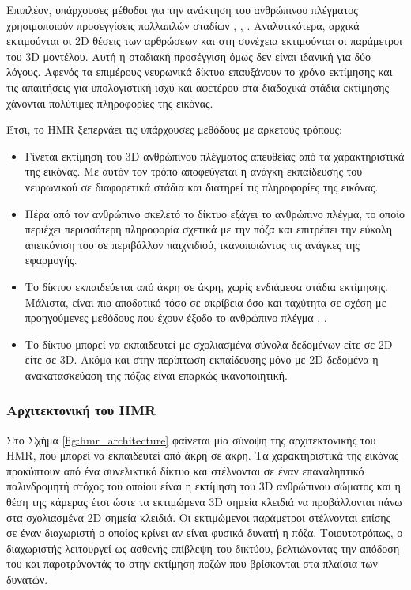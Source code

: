 Επιπλέον, υπάρχουσες μέθοδοι για την ανάκτηση του ανθρώπινου πλέγματος χρησιμοποιούν προσεγγίσεις πολλαπλών σταδίων \cite{keep_it_smpl_paper}, \cite{unite_the_people}, \cite{estimate_from_single_color_paper}. Αναλυτικότερα, αρχικά εκτιμούνται οι 2D θέσεις των αρθρώσεων και στη συνέχεια εκτιμούνται οι παράμετροι του 3D μοντέλου. Αυτή η σταδιακή προσέγγιση όμως δεν είναι ιδανική για δύο λόγους. Αφενός τα επιμέρους νευρωνικά δίκτυα επαυξάνουν το χρόνο εκτίμησης και τις απαιτήσεις για υπολογιστική ισχύ και αφετέρου στα διαδοχικά στάδια εκτίμησης χάνονται πολύτιμες πληροφορίες της εικόνας.

Έτσι, το HMR ξεπερνάει τις υπάρχουσες μεθόδους με αρκετούς τρόπους:

\begin{itemize}
	\item Γίνεται εκτίμηση του 3D ανθρώπινου πλέγματος απευθείας από τα χαρακτηριστικά της εικόνας. Με αυτόν τον τρόπο αποφεύγεται η ανάγκη εκπαίδευσης του νευρωνικού σε διαφορετικά στάδια και διατηρεί τις πληροφορίες της εικόνας.
	\item Πέρα από τον ανθρώπινο σκελετό το δίκτυο εξάγει το ανθρώπινο πλέγμα, το οποίο περιέχει περισσότερη πληροφορία σχετικά με την πόζα και επιτρέπει την εύκολη απεικόνιση του σε περιβάλλον παιχνιδιού, ικανοποιώντας τις ανάγκες της εφαρμογής.
	\item Το δίκτυο εκπαιδεύεται από άκρη σε άκρη, χωρίς ενδιάμεσα στάδια εκτίμησης. Μάλιστα, είναι πιο αποδοτικό τόσο σε ακρίβεια όσο και ταχύτητα σε σχέση με προηγούμενες μεθόδους που έχουν έξοδο το ανθρώπινο πλέγμα \cite{unite_the_people}, \cite{keep_it_smpl_paper}.
	\item Το δίκτυο μπορεί να εκπαιδευτεί με σχολιασμένα σύνολα δεδομένων είτε σε 2D είτε σε 3D. Ακόμα και στην περίπτωση εκπαίδευσης μόνο με 2D δεδομένα η ανακατασκεύαση της πόζας είναι επαρκώς ικανοποιητική.
\end{itemize}

\subsubsection{Αρχιτεκτονική του HMR}
Στο Σχήμα \ref{fig:hmr_architecture} φαίνεται μία σύνοψη της αρχιτεκτονικής του HMR, που μπορεί να εκπαιδευτεί από άκρη σε άκρη. Τα χαρακτηριστικά της εικόνας προκύπτουν από ένα συνελικτικό δίκτυο και στέλνονται σε έναν επαναληπτικό παλινδρομητή στόχος του οποίου είναι η εκτίμηση του 3D ανθρώπινου σώματος και η θέση της κάμερας έτσι ώστε τα εκτιμώμενα 3D σημεία κλειδιά να προβάλλονται πάνω στα σχολιασμένα 2D σημεία κλειδιά. Οι εκτιμώμενοι παράμετροι στέλνονται επίσης σε έναν διαχωριστή ο οποίος κρίνει αν είναι φυσικά δυνατή η πόζα. Τοιουτοτρόπως, ο διαχωριστής λειτουργεί ως ασθενής επίβλεψη του δικτύου, βελτιώνοντας την απόδοση του και παροτρύνοντάς το στην εκτίμηση ποζών που βρίσκονται στα πλαίσια των δυνατών.


